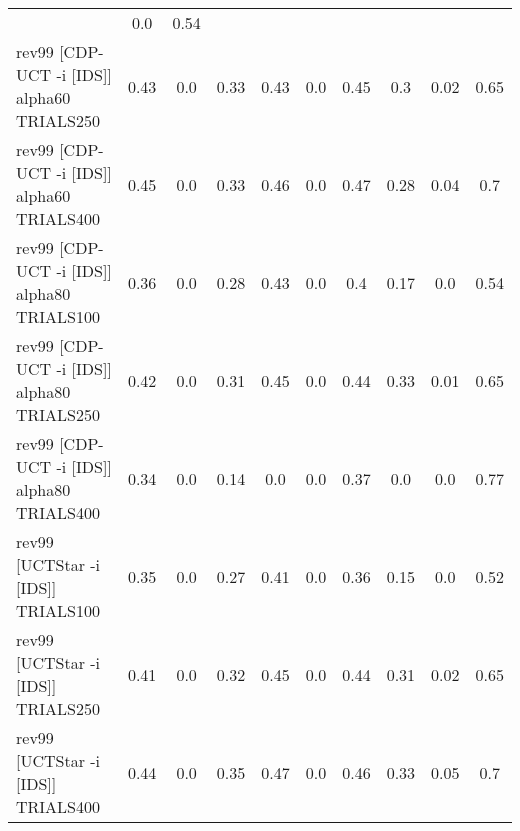 \documentclass{article}
\begin{document}
\begin{tabular}{|l|r@{$\pm$}rr@{$\pm$}rr@{$\pm$}rr@{$\pm$}rr@{$\pm$}rr@{$\pm$}rr@{$\pm$}rr@{$\pm$}rr@{$\pm$}r|}
& \multicolumn{2}{c}{0.0}
& \multicolumn{2}{c|}{0.54}
\\
rev99 [CDP-UCT -i [IDS]] alpha60 TRIALS250
& \multicolumn{2}{c}{0.43}
& \multicolumn{2}{c}{0.0}
& \multicolumn{2}{c}{0.33}
& \multicolumn{2}{c}{0.43}
& \multicolumn{2}{c}{0.0}
& \multicolumn{2}{c}{0.45}
& \multicolumn{2}{c}{0.3}
& \multicolumn{2}{c}{0.02}
& \multicolumn{2}{c|}{0.65}
\\
rev99 [CDP-UCT -i [IDS]] alpha60 TRIALS400
& \multicolumn{2}{c}{0.45}
& \multicolumn{2}{c}{0.0}
& \multicolumn{2}{c}{0.33}
& \multicolumn{2}{c}{0.46}
& \multicolumn{2}{c}{0.0}
& \multicolumn{2}{c}{0.47}
& \multicolumn{2}{c}{0.28}
& \multicolumn{2}{c}{0.04}
& \multicolumn{2}{c|}{0.7}
\\
rev99 [CDP-UCT -i [IDS]] alpha80 TRIALS100
& \multicolumn{2}{c}{0.36}
& \multicolumn{2}{c}{0.0}
& \multicolumn{2}{c}{0.28}
& \multicolumn{2}{c}{0.43}
& \multicolumn{2}{c}{0.0}
& \multicolumn{2}{c}{0.4}
& \multicolumn{2}{c}{0.17}
& \multicolumn{2}{c}{0.0}
& \multicolumn{2}{c|}{0.54}
\\
rev99 [CDP-UCT -i [IDS]] alpha80 TRIALS250
& \multicolumn{2}{c}{0.42}
& \multicolumn{2}{c}{0.0}
& \multicolumn{2}{c}{0.31}
& \multicolumn{2}{c}{0.45}
& \multicolumn{2}{c}{0.0}
& \multicolumn{2}{c}{0.44}
& \multicolumn{2}{c}{0.33}
& \multicolumn{2}{c}{0.01}
& \multicolumn{2}{c|}{0.65}
\\
rev99 [CDP-UCT -i [IDS]] alpha80 TRIALS400
& \multicolumn{2}{c}{0.34}
& \multicolumn{2}{c}{0.0}
& \multicolumn{2}{c}{0.14}
& \multicolumn{2}{c}{0.0}
& \multicolumn{2}{c}{0.0}
& \multicolumn{2}{c}{0.37}
& \multicolumn{2}{c}{0.0}
& \multicolumn{2}{c}{0.0}
& \multicolumn{2}{c|}{0.77}
\\
rev99 [UCTStar -i [IDS]] TRIALS100
& \multicolumn{2}{c}{0.35}
& \multicolumn{2}{c}{0.0}
& \multicolumn{2}{c}{0.27}
& \multicolumn{2}{c}{0.41}
& \multicolumn{2}{c}{0.0}
& \multicolumn{2}{c}{0.36}
& \multicolumn{2}{c}{0.15}
& \multicolumn{2}{c}{0.0}
& \multicolumn{2}{c|}{0.52}
\\
rev99 [UCTStar -i [IDS]] TRIALS250
& \multicolumn{2}{c}{0.41}
& \multicolumn{2}{c}{0.0}
& \multicolumn{2}{c}{0.32}
& \multicolumn{2}{c}{0.45}
& \multicolumn{2}{c}{0.0}
& \multicolumn{2}{c}{0.44}
& \multicolumn{2}{c}{0.31}
& \multicolumn{2}{c}{0.02}
& \multicolumn{2}{c|}{0.65}
\\
rev99 [UCTStar -i [IDS]] TRIALS400
& \multicolumn{2}{c}{0.44}
& \multicolumn{2}{c}{0.0}
& \multicolumn{2}{c}{0.35}
& \multicolumn{2}{c}{0.47}
& \multicolumn{2}{c}{0.0}
& \multicolumn{2}{c}{0.46}
& \multicolumn{2}{c}{0.33}
& \multicolumn{2}{c}{0.05}
& \multicolumn{2}{c|}{0.7}
\\
\hline
\end{tabular}%

\bigskip
\end{document}
